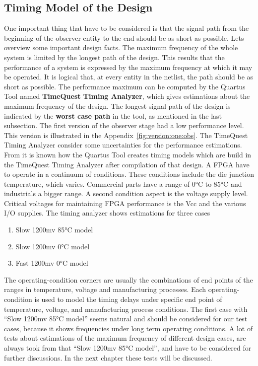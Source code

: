\subsection{Timing Model of the Design}
One important thing that have to be considered is that the signal path from the beginning of the observer entity to the end should be as short as possible. 
Lets overview some important design facts. \newline
The maximum frequency of the whole system is limited by the longest path of the design. This results that the performance of a system is expressed by the maximum frequency at which it may be operated. 
It is logical that, at every entity in the netlist, the path should be as short as possible. 
The performance maximum can be computed by the Quartus Tool named \textbf{TimeQuest Timing Analyzer}, which gives estimations about the maximum frequency of the design. 
The longest signal path of the design is indicated by the \textbf{worst case path} in the tool, as mentioned in the last subsection. \newline
The first version of the observer stage had a low performance level. This version is illustrated in the Appendix~\ref{fig:version:one:obs}. 
The TimeQuest Timing Analyzer consider some uncertainties for the performance estimations. From \cite{altera2} it is known how the Quartus Tool creates timing models which are
build in the TimeQuest Timing Analyzer after compilation of that design. 
A FPGA have to operate in a continuum of conditions. These conditions include the die junction temperature, which varies. 
Commercial parts have a range of 0°C to 85°C and industrials a bigger range. 
A second condition aspect is the voltage supply level. Critical voltages for maintaining FPGA performance is the Vcc and the various I/O supplies. 
\newline
The timing analyzer shows estimations for three cases
\begin{enumerate}
\item Slow 1200mv 85°C model
\item Slow 1200mv 0°C model
\item Fast 1200mv 0°C model
\end{enumerate}

The operating-condition corners are usually the combinations of end points of the ranges in temperature, voltage and manufacturing processes. 
Each operating-condition is used to model the timing delays under specific end point of temperature, voltage, and manufacturing process conditions. 
The first case with ``Slow 1200mv 85°C model'' seems natural and should be considered for our test cases, because it shows frequencies under long term 
operating conditions. 
A lot of tests about estimations of the maximum frequency of different design cases, are always took from that ``Slow 1200mv 85°C model'', and have to be considered
for further discussions. In the next chapter these tests will be discussed. 

